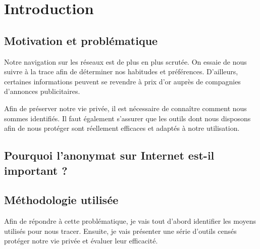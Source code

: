 \chapter{Introduction}
\section{Motivation et problématique}
Notre navigation sur les réseaux est de plus en plus scrutée. On essaie de nous suivre à la trace afin de déterminer nos habitudes et préférences. D'ailleurs, certaines informations peuvent se revendre à prix d'or auprès de compagnies d'annonces publicitaires.

Afin de préserver notre vie privée, il est nécessaire de connaître comment nous sommes identifiés. Il faut également s'assurer que les outils dont nous disposons afin de nous protéger sont réellement efficaces et adaptés à notre utilisation.

\section{Pourquoi l'anonymat sur Internet est-il important ?}

\section{Méthodologie utilisée}
Afin de répondre à cette problématique, je vais tout d'abord identifier les moyens utilisés pour nous tracer. Ensuite, je vais présenter une série d'outils censés protéger notre vie privée et évaluer leur efficacité.